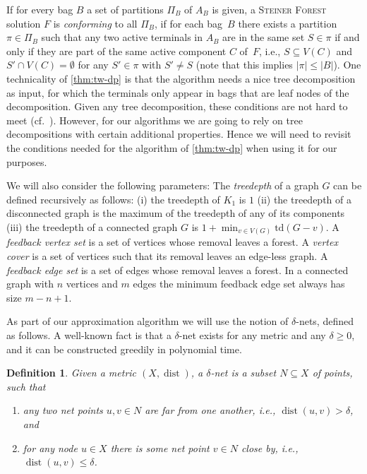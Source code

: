 \documentclass[a4paper]{article}
\theoremstyle{plain}
\newtheorem{definition}[theorem]{Definition}
\newcommand{\pname}[1]{\textsc{#1}}
\DeclareMathOperator{\dist}{dist}
\newcommand{\SF}{\pname{Steiner Forest}\xspace}
\begin{document}
If for every bag $B$ a set of partitions $\Pi_B$ of $A_B$ is given, a
\SF solution $F$ is \emph{conforming} to all $\Pi_B$, if for each bag~$B$ there exists a partition
$\pi\in\Pi_B$ such that any two active terminals in $A_B$ are in the same set
$S\in\pi$ if and only if they are part of the same active component $C$ of~$F$,
i.e., $S\subseteq V(C)$ and $S'\cap V(C)=\emptyset$ for any $S'\in\pi$ with
$S'\neq S$ (note that this implies $|\pi|\leq |B|$). One technicality of \cref{thm:tw-dp} is that
the algorithm needs a nice tree decomposition as input, for which the terminals
only appear in bags that are leaf nodes of the decomposition. Given any tree
decomposition, these conditions are not hard to meet
(cf.~\cite[Lemma~6]{bateni2011approximation}).  However, for our algorithms we
are going to rely on tree decompositions with certain additional properties.
Hence we will need to revisit the conditions needed for the algorithm of
\autoref{thm:tw-dp} when using it for our purposes.

We will also consider the following parameters: 
The \emph{treedepth} of a graph $G$ can be defined recursively as follows: (i) the treedepth of $K_1$ is $1$ (ii) the treedepth of a disconnected graph is the maximum of the treedepth of any of its components (iii) the treedepth of a connected graph $G$ is $1+\min_{v\in V(G)} \textrm{td}(G-v)$. 
A \emph{feedback vertex set} is a set of vertices whose removal leaves a forest. A \emph{vertex cover} is a set of vertices such that its removal leaves an edge-less graph. A \emph{feedback edge set} is a set of edges whose removal leaves a forest. In a connected graph with $n$ vertices and $m$ edges the minimum feedback edge set always has size $m-n+1$.

As part of our approximation algorithm we will use the notion of $\delta$-nets, defined as follows. 
A well-known fact is that a $\delta$-net exists for any metric and any $\delta\geq 0$, 
and it can be constructed greedily in polynomial time. 

\begin{definition}\label{dfn:net}
Given a metric $(X,\dist)$, a \emph{$\delta$-net} is a subset $N\subseteq X$ of points, such that
\begin{enumerate}
    \item any two net points $u,v\in N$ are far from one another, i.e., $\dist(u,v)>\delta$, and
    \item for any node $u\in X$ there is some net point $v\in N$ close by, i.e., $\dist(u,v)\leq\delta$.
\end{enumerate}
\end{definition}
\end{document}
